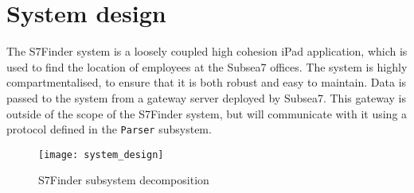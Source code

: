 \section{System design} %
\label{sec:system_design}

The S7Finder system is a loosely coupled high cohesion iPad application, which is used to find
the location of employees at the Subsea7 offices. The system is highly compartmentalised, to ensure that
it is both robust and easy to maintain. Data is passed to the system from a gateway server deployed by
Subsea7. This gateway is outside of the scope of the S7Finder system, but will communicate with it using
a protocol defined in the \texttt{Parser} subsystem.

\begin{figure}[h!]
    \centerline{\texttt{[image: system\_design]}}
    \caption{S7Finder subsystem decomposition}
    \label{fig:subsystem_decomposition}
\end{figure}

